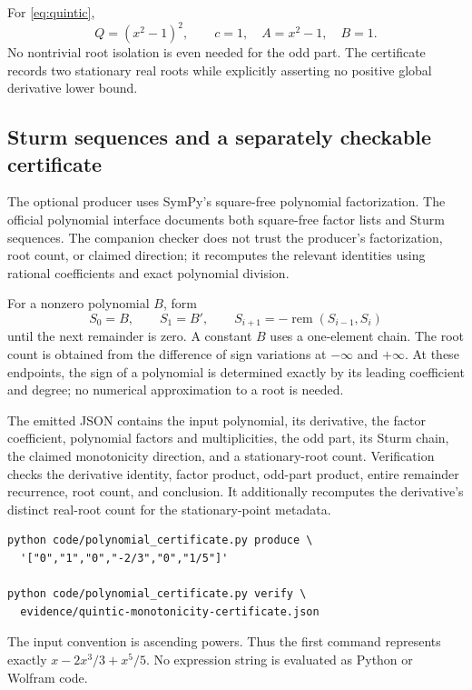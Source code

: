 \documentclass[11pt,letterpaper]{article}
\begin{document}
For \eqref{eq:quintic},
\[
 Q=(x^2-1)^2,\qquad c=1,\quad A=x^2-1,\quad B=1.
\]
No nontrivial root isolation is even needed for the odd part. The certificate records two stationary real roots while explicitly asserting no positive global derivative lower bound.

\subsection{Sturm sequences and a separately checkable certificate}
The optional producer uses SymPy's square-free polynomial factorization. The official polynomial interface documents both square-free factor lists and Sturm sequences. The companion checker does not trust the producer's factorization, root count, or claimed direction; it recomputes the relevant identities using rational coefficients and exact polynomial division.\cite{sympypoly}

For a nonzero polynomial \(B\), form
\[
 S_0=B,\qquad S_1=B',\qquad
 S_{i+1}=-\operatorname{rem}(S_{i-1},S_i)
\]
until the next remainder is zero. A constant \(B\) uses a one-element chain. The root count is obtained from the difference of sign variations at \(-\infty\) and \(+\infty\). At these endpoints, the sign of a polynomial is determined exactly by its leading coefficient and degree; no numerical approximation to a root is needed.

The emitted JSON contains the input polynomial, its derivative, the factor coefficient, polynomial factors and multiplicities, the odd part, its Sturm chain, the claimed monotonicity direction, and a stationary-root count. Verification checks the derivative identity, factor product, odd-part product, entire remainder recurrence, root count, and conclusion. It additionally recomputes the derivative's distinct real-root count for the stationary-point metadata.

\par\noindent\begin{minipage}{\linewidth}
\begin{lstlisting}
python code/polynomial_certificate.py produce \
  '["0","1","0","-2/3","0","1/5"]'

python code/polynomial_certificate.py verify \
  evidence/quintic-monotonicity-certificate.json
\end{lstlisting}
\end{minipage}\par
The input convention is ascending powers. Thus the first command represents exactly \(x-2x^3/3+x^5/5\). No expression string is evaluated as Python or Wolfram code.
\end{document}
